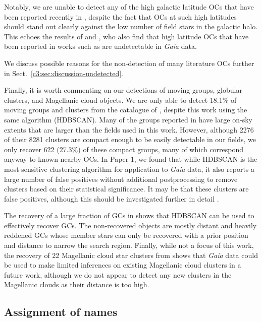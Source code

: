 Notably, we are unable to detect any of the high galactic latitude OCs that have been reported recently in \cite{li_lisc_2023}, despite the fact that OCs at such high latitudes should stand out clearly against the low number of field stars in the galactic halo. This echoes the results of \cite{cantat-gaudin_characterising_2018} and \cite{cantat-gaudin_clusters_2020}, who also find that high latitude OCs that have been reported in works such as \cite{schmeja_global_2014} are undetectable in \emph{Gaia} data.

We discuss possible reasons for the non-detection of many literature OCs further in Sect.~\ref{c3:sec:discussion-undetected}.

Finally, it is worth commenting on our detections of moving groups, globular clusters, and Magellanic cloud objects. We are only able to detect 18.1\% of moving groups and clusters from the catalogue of \cite{kounkel_untangling_2020}, despite this work using the same algorithm (HDBSCAN). Many of the groups reported in \cite{kounkel_untangling_2020} have large on-sky extents that are larger than the fields used in this work. However, although 2276 of their 8281 clusters are compact enough to be easily detectable in our fields, we only recover 622 (27.3\%) of these compact groups, many of which correspond anyway to known nearby OCs. In Paper 1, we found that while HDBSCAN is the most sensitive clustering algorithm for application to \emph{Gaia} data, it also reports a large number of false positives without additional postprocessing to remove clusters based on their statistical significance. It may be that these clusters are false positives, although this should be investigated further in detail \citep[see e.g.][]{zucker_disconnecting_2022}.

The recovery of a large fraction of GCs in \cite{vasiliev_gaia_2021} shows that HDBSCAN can be used to effectively recover GCs. The non-recovered objects are mostly distant and heavily reddened GCs whose member stars can only be recovered with a prior position and distance to narrow the search region. Finally, while not a focus of this work, the recovery of 22 Magellanic cloud star clusters from \cite{bica_general_2008} shows that \emph{Gaia} data could be used to make limited inferences on existing Magellanic cloud clusters in a future work, although we do not appear to detect any new clusters in the Magellanic clouds as their distance is too high. 

\subsection{Assignment of names}\label{c3:sec:crossmatching:names}

